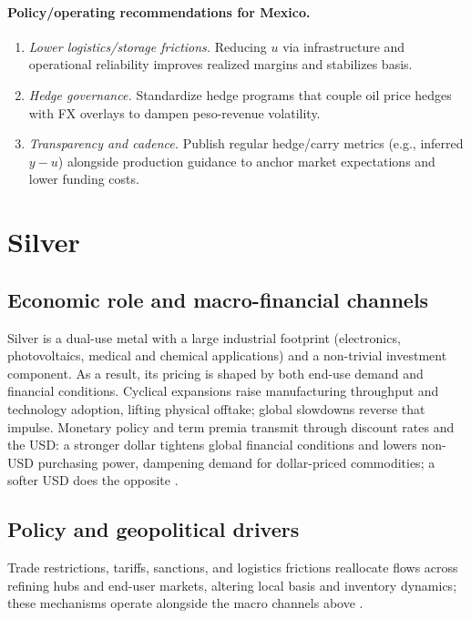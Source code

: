\documentclass[11pt,a4paper]{article} %
\let\oldsection\section
\renewcommand{\section}{%
    \clearpage
    \thispagestyle{myfancy}%
    \oldsection
  }
\begin{document}
\paragraph{Policy/operating recommendations for Mexico.}
\begin{enumerate}
  \item \emph{Lower logistics/storage frictions.} Reducing \(u\) via infrastructure and operational reliability improves realized margins and stabilizes basis.
  \item \emph{Hedge governance.} Standardize hedge programs that couple oil price hedges with FX overlays to dampen peso-revenue volatility.
  \item \emph{Transparency and cadence.} Publish regular hedge/carry metrics (e.g., inferred \(y-u\)) alongside production guidance to anchor market expectations and lower funding costs.
\end{enumerate}



\section{Silver}

\subsection{Economic role and macro-financial channels}
Silver is a dual-use metal with a large industrial footprint (electronics, photovoltaics, medical and chemical applications) and a non-trivial investment component. As a result, its pricing is shaped by both end-use demand and financial conditions. Cyclical expansions raise manufacturing throughput and technology adoption, lifting physical offtake; global slowdowns reverse that impulse. Monetary policy and term premia transmit through discount rates and the USD: a stronger dollar tightens global financial conditions and lowers non-USD purchasing power, dampening demand for dollar-priced commodities; a softer USD does the opposite \citep{silver_institute_wss_2024,usgs_silver_mcs_2024,bis_usd_commodity_2023}.

\subsection{Policy and geopolitical drivers}
Trade restrictions, tariffs, sanctions, and logistics frictions reallocate flows across refining hubs and end-user markets, altering local basis and inventory dynamics; these mechanisms operate alongside the macro channels above \citep{silver_institute_wss_2024}.
\end{document}
